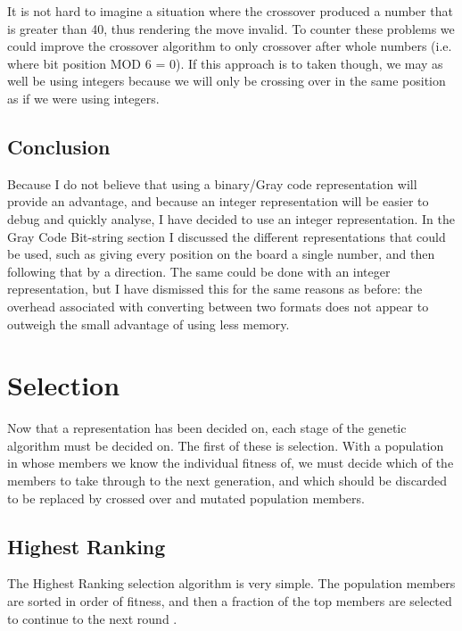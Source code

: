 \documentclass[]{report}
\begin{document}
It is not hard to imagine a situation where the crossover produced a number that is greater than 40, thus rendering the move invalid. To counter these problems we could improve the crossover algorithm to only crossover after whole numbers (i.e. where bit position MOD 6 = 0). If this approach is to taken though, we may as well be using integers because we will only be crossing over in the same position as if we were using integers. \\

\subsection{Conclusion}

Because I do not believe that using a binary/Gray code representation will provide an advantage, and because an integer representation will be easier to debug and quickly analyse, I have decided to use an integer representation. In the Gray Code Bit-string section I discussed the different representations that could be used, such as giving every position on the board a single number, and then following that by a direction. The same could be done with an integer representation, but I have dismissed this for the same reasons as before: the overhead associated with converting between two formats does not appear to outweigh the small advantage of using less memory. \\

\section{Selection}
Now that a representation has been decided on, each stage of the genetic algorithm must be decided on. The first of these is selection. With a population in whose members we know the individual fitness of, we must decide which of the members to take through to the next generation, and which should be discarded to be replaced by crossed over and mutated population members.

\subsection{Highest Ranking}

The Highest Ranking selection algorithm is very simple. The population members are sorted in order of fitness, and then a fraction of the top members are selected to continue to the next round \cite{ECIntro, MitchelGA}. \\
\end{document}
